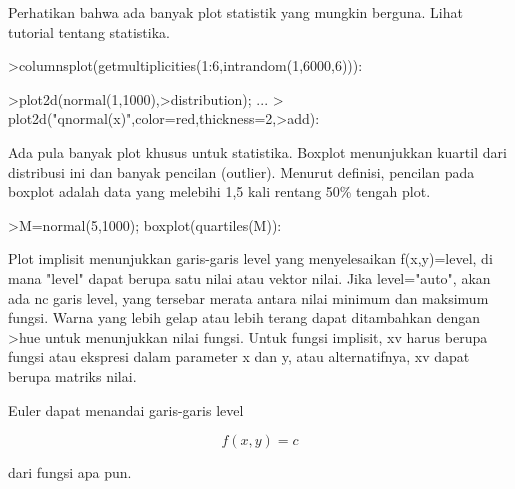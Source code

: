 \documentclass[a4paper,10pt]{article}
\begin{document}
\begin{eulernotebook}
\begin{eulercomment}
\begin{eulercomment}
\begin{eulercomment}
\begin{eulercomment}
\begin{eulercomment}
\begin{eulercomment}
\begin{eulercomment}
Perhatikan bahwa ada banyak plot statistik yang mungkin berguna. Lihat tutorial
tentang statistika.
\end{eulercomment}
\begin{eulerprompt}
>columnsplot(getmultiplicities(1:6,intrandom(1,6000,6))):
\end{eulerprompt}
\begin{eulerprompt}
>plot2d(normal(1,1000),>distribution); ...
>  plot2d("qnormal(x)",color=red,thickness=2,>add):
\end{eulerprompt}
\begin{eulercomment}
Ada pula banyak plot khusus untuk statistika. Boxplot menunjukkan kuartil dari
distribusi ini dan banyak pencilan (outlier). Menurut definisi, pencilan pada boxplot
adalah data yang melebihi 1,5 kali rentang 50\% tengah plot.
\end{eulercomment}
\begin{eulerprompt}
>M=normal(5,1000); boxplot(quartiles(M)):
\end{eulerprompt}
\begin{eulercomment}
Plot implisit menunjukkan garis-garis level yang menyelesaikan f(x,y)=level, di mana
"level" dapat berupa satu nilai atau vektor nilai. Jika level="auto", akan ada nc
garis level, yang tersebar merata antara nilai minimum dan maksimum fungsi. Warna yang
lebih gelap atau lebih terang dapat ditambahkan dengan \textgreater{}hue untuk menunjukkan nilai
fungsi. Untuk fungsi implisit, xv harus berupa fungsi atau ekspresi dalam parameter x
dan y, atau alternatifnya, xv dapat berupa matriks nilai.

Euler dapat menandai garis-garis level

\end{eulercomment}
\begin{eulerformula}
\[
f(x,y) = c
\]
\end{eulerformula}
\begin{eulercomment}
dari fungsi apa pun.


\end{eulercomment}
\end{eulercomment}
\end{eulercomment}
\end{eulercomment}
\end{eulercomment}
\end{eulercomment}
\end{eulercomment}
\end{eulernotebook}
\end{document}
